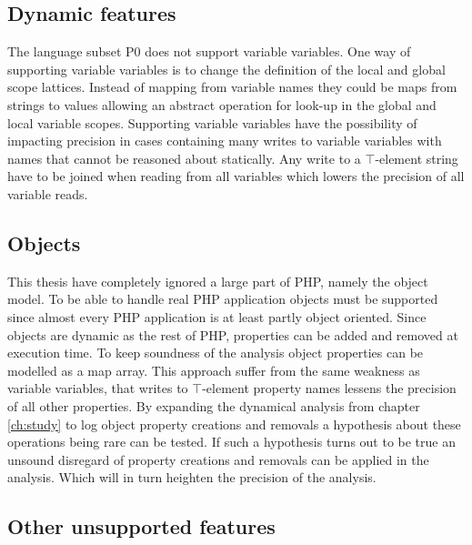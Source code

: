 \subsection{Dynamic features}
The language subset P0 does not support variable variables. One way of supporting variable variables is to change the definition of the local and global scope lattices. Instead of mapping from variable names they could be maps from strings to values allowing an abstract operation for look-up in the global and local variable scopes. Supporting variable variables have the possibility of impacting precision in cases containing many writes to variable variables with names that cannot be reasoned about statically. Any write to a $\top$-element string have to be joined when reading from all variables which lowers the precision of all variable reads.




\subsection{Objects}
This thesis have completely ignored a large part of PHP, namely the object model. To be able to handle real PHP application objects must be supported since almost every PHP application is at least partly object oriented. Since objects are dynamic as the rest of PHP, properties can be added and removed at execution time. To keep soundness of the analysis object properties can be modelled as a map array. This approach suffer from the same weakness as variable variables, that writes to $\top$-element property names lessens the precision of all other properties. By expanding the dynamical analysis from chapter \ref{ch:study} to log object property creations and removals a hypothesis about these operations being rare can be tested. If such a hypothesis turns out to be true an unsound disregard of property creations and removals can be applied in the analysis. Which will in turn heighten the precision of the analysis.

\subsection{Other unsupported features}
